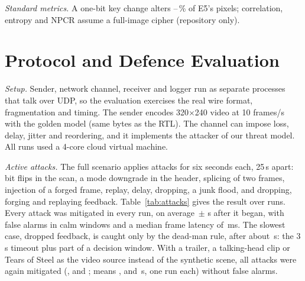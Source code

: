 \documentclass{ieeeaccess}
\newif\ifextended
\begin{document}
\ifextended \textit{Standard metrics.} On all \StdSources{} sources (full table in our repository), key sensitivity holds: a one-bit key change makes E5 decryption differ in \StdNpcrEfiveMin--\StdNpcrEfiveMax\,\% of the pixels (SSIM $\le$\StdWrongSsimEfiveMax). The other metrics assume a cipher that turns the image into noise: the 8$\times$8 block structure survives, so adjacent-pixel correlation stays at \StdCorrMin--\StdCorrMax{} and entropy rises only under E5 (\StdEntropyPlain{} to \StdEntropyEfive{} bits), and the 1-pixel NPCR (at most \StdPixelNpcrMax\,\%) measures diffusion, which a stream cipher with a fresh nonce per frame does not need. We report them for comparability only.\else\textit{Standard metrics.} A one-bit key change alters \StdNpcrEfiveMin--\StdNpcrEfiveMax\,\% of E5's pixels; correlation, entropy and NPCR assume a full-image cipher (repository only).\fi


\ifextended\fi

\section{Protocol and Defence Evaluation}\label{sec:protocol}
\textit{Setup.} Sender, network channel, receiver and logger run as separate processes that talk over UDP, so the evaluation exercises the real wire format, fragmentation and timing. The sender encodes 320$\times$240 video at 10 frames/s with the golden model (same bytes as the RTL). The channel can impose loss, delay, jitter and reordering, and it implements the attacker of our threat model. All runs used a 4-core cloud virtual machine.

\textit{Active attacks.} The full scenario applies \NumAttacks{} attacks for six seconds each, 25\,s apart: bit flips in the scan, a mode downgrade in the header, splicing of two frames, injection of a forged frame, replay, delay, dropping, a junk flood, and dropping, forging and replaying feedback. Table~\ref{tab:attacks} gives the result over \SuiteRuns{} runs. Every attack was mitigated in every run, on average \TtmMean{}\,$\pm$\,\TtmSd{}\,s after it began, with \SuiteFalse{} false alarms in calm windows and a median frame latency of \SuiteLatency\,ms. The slowest case, dropped feedback, is caught only by the dead-man rule, after about \FbDropTtm\,s: the 3\,s timeout plus part of a decision window. With a trailer, a talking-head clip or Tears of Steel as the video source instead of the synthetic scene, all attacks were again mitigated (\RealTrailerMit{}, \RealTalkMit{} and \RealOpenMit{}; means \RealTrailerTtm{}, \RealTalkTtm{} and \RealOpenTtm{}\,s, one run each) without false alarms.
\end{document}
